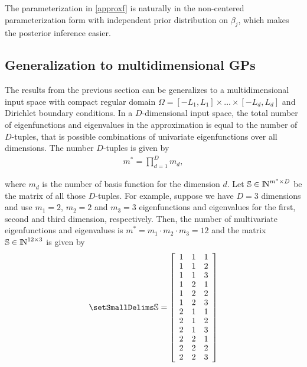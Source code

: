 \documentclass[]{interact}
\theoremstyle{plain}%
\theoremstyle{definition}
\theoremstyle{remark}
\begin{document}
The parameterization in \ref{approxf} is naturally in the non-centered
parameterization form with independent prior distribution on
$\beta_j$, which makes the posterior inference easier.

\subsection{Generalization to multidimensional GPs}

The results from the previous section can be generalizes to a multidimensional input space with compact regular domain $\Omega=[-L_1,L_1] \times \dots \times [-L_d,L_d]$ and Dirichlet boundary conditions. 
In a $D$-dimensional input space, the total number of eigenfunctions and eigenvalues in the approximation is equal to the number of $D$-tuples, that is possible combinations of univariate eigenfunctions over all dimensions. The number $D$-tuples is given by 
%
\begin{align} \label{m_multi}
m^{\ast} = \prod_{d=1}^{D} m_d,
\end{align}

\noindent where $m_d$ is the number of basis function for the dimension $d$. Let $\mathbb{S}\in {\rm I\!N}^{m^{\ast} \times D}$ be the matrix of all those $D$-tuples. For example, suppose we have $D=3$ dimensions and use $m_{1}=2$, $m_{2}=2$ and $m_{3}=3$ eigenfunctions and eigenvalues for the first, second and third dimension, respectively. Then, the number of multivariate eigenfunctions and eigenvalues is $m^{\ast} = m_{1} \cdot m_{2} \cdot m_{3} = 12$ and the matrix $\mathbb{S}\in {\rm I\!N}^{12 \times 3}$ is given by
\begin{align}\small
\mathbb{S}=
\left[ {\begin{array}{ccc}
1 & 1 & 1 \nonumber \\
1 & 1 & 2 \\
1 & 1 & 3 \\
1 & 2 & 1 \\
1 & 2 & 2 \\
1 & 2 & 3 \\
2 & 1 & 1 \\
2 & 1 & 2 \\
2 & 1 & 3 \\
2 & 2 & 1 \\
2 & 2 & 2 \\
2 & 2 & 3 
\end{array} } \right]
\end{align} 
\end{document}
